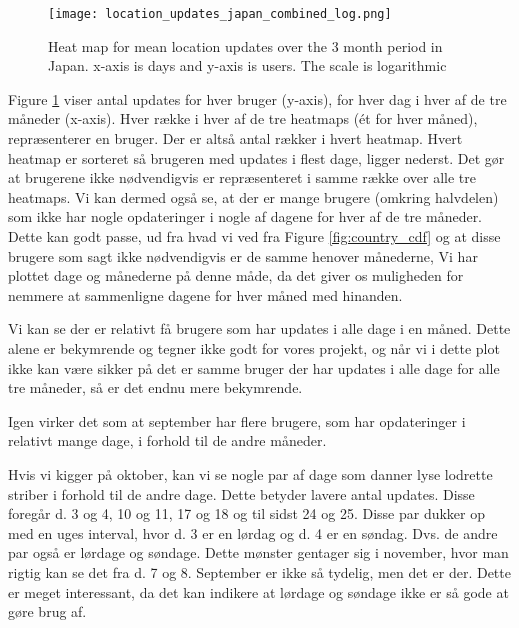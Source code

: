 \begin{figure}[H]
    \hspace*{-1.5cm}
    \centering
    \texttt{[image: location\_updates\_japan\_combined\_log.png]}
    \caption{Heat map for mean location updates over the 3 month period in Japan. x-axis is days and y-axis is users. The scale is logarithmic}
    \vspace{-12pt}
    \label{fig:heatmap_japan_combined}
\end{figure}
Figure \ref{fig:heatmap_japan_combined} viser antal updates for hver bruger (y-axis), for hver dag i hver af de tre måneder (x-axis). Hver række i hver af de tre heatmaps (ét for hver måned), repræsenterer en bruger. Der er altså \numberUsersJapan{} antal rækker i hvert heatmap. Hvert heatmap er sorteret så brugeren med updates i flest dage, ligger nederst. Det gør at brugerene ikke nødvendigvis er repræsenteret i samme række over alle tre heatmaps. Vi kan dermed også se, at der er mange brugere (omkring halvdelen) som ikke har nogle opdateringer i nogle af dagene for hver af de tre måneder. Dette kan godt passe, ud fra hvad vi ved fra Figure \ref{fig:country_cdf} og at disse brugere som sagt ikke nødvendigvis er de samme henover månederne, 
Vi har plottet dage og månederne på denne måde, da det giver os muligheden for nemmere at sammenligne dagene for hver måned med hinanden. 

Vi kan se der er relativt få brugere som har updates i alle dage i en måned. Dette alene er bekymrende og tegner ikke godt for vores projekt, og når vi i dette plot ikke kan være sikker på det er samme bruger der har updates i alle dage for alle tre måneder, så er det endnu mere bekymrende. 

Igen virker det som at september har flere brugere, som har opdateringer i relativt mange dage, i forhold til de andre måneder.

Hvis vi kigger på oktober, kan vi se nogle par af dage som danner lyse lodrette striber i forhold til de andre dage. Dette betyder lavere antal updates. Disse foregår d. 3 og 4, 10 og 11, 17 og 18 og til sidst 24 og 25. Disse par dukker op med en uges interval, hvor d. 3 er en lørdag og d. 4 er en søndag. Dvs. de andre par også er lørdage og søndage. Dette mønster gentager sig i november, hvor man rigtig kan se det fra d. 7 og 8. September er ikke så tydelig, men det er der. Dette er meget interessant, da det kan indikere at lørdage og søndage ikke er så gode at gøre brug af. 

